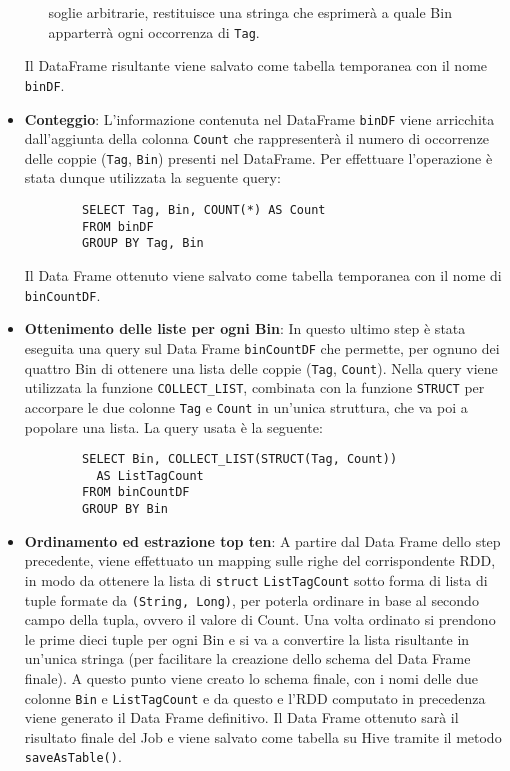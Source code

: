 \begin{itemize}
\begin{itemize}
          soglie arbitrarie, restituisce una stringa che esprimerà a quale Bin apparterrà ogni occorrenza di \texttt{Tag}.
    \end{itemize}
    Il DataFrame risultante viene salvato come tabella temporanea con il nome \texttt{binDF}.
    \item
      \textbf{Conteggio}:
      L'informazione contenuta nel DataFrame \texttt{binDF} viene arricchita dall'aggiunta
      della colonna \texttt{Count} che rappresenterà il numero di occorrenze delle coppie (\texttt{Tag}, \texttt{Bin}) presenti
      nel DataFrame.
      Per effettuare l'operazione è stata dunque utilizzata la seguente query:
      \begin{verbatim}
        SELECT Tag, Bin, COUNT(*) AS Count
        FROM binDF
        GROUP BY Tag, Bin
      \end{verbatim}

      Il Data Frame ottenuto viene salvato come tabella temporanea con il nome di \texttt{binCountDF}.
    \item
      \textbf{Ottenimento delle liste per ogni Bin}:
      In questo ultimo step è stata eseguita una query sul Data Frame
      \texttt{binCountDF} che permette, per ognuno dei quattro Bin di ottenere una lista delle coppie (\texttt{Tag}, \texttt{Count}).
      Nella query viene utilizzata la funzione \texttt{COLLECT\_LIST}, combinata con la funzione \texttt{STRUCT} per accorpare
      le due colonne \texttt{Tag} e \texttt{Count} in un'unica struttura, che va poi a popolare una lista.
      La query usata è la seguente:
      \begin{verbatim}
        SELECT Bin, COLLECT_LIST(STRUCT(Tag, Count))
          AS ListTagCount
        FROM binCountDF
        GROUP BY Bin
      \end{verbatim}

    \item
      \textbf{Ordinamento ed estrazione top ten}:
      A partire dal Data Frame dello step precedente, viene effettuato un
      mapping sulle righe del corrispondente RDD, in modo da ottenere la lista di \texttt{struct} \texttt{ListTagCount} sotto forma
      di lista di tuple formate da \texttt{(String, Long)}, per poterla ordinare in base al secondo campo della tupla, ovvero
      il valore di Count.
      Una volta ordinato si prendono le prime dieci tuple per ogni Bin e si va a convertire la lista risultante in un'unica stringa
      (per facilitare la creazione dello schema del Data Frame finale).
      A questo punto viene creato lo schema finale, con i nomi delle due colonne \texttt{Bin} e \texttt{ListTagCount} e da questo
      e l'RDD computato in precedenza viene generato il Data Frame definitivo.
      Il Data Frame ottenuto sarà il risultato finale del Job e viene salvato come tabella su Hive tramite il metodo
      \texttt{saveAsTable()}. %
  \end{itemize}


